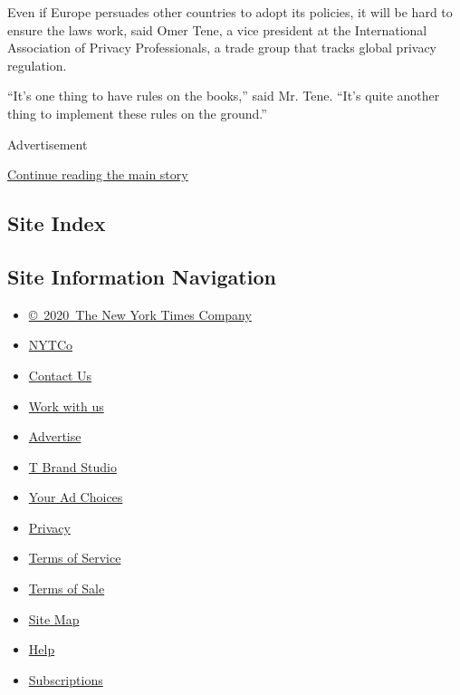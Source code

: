 Even if Europe persuades other countries to adopt its policies, it will
be hard to ensure the laws work, said Omer Tene, a vice president at the
International Association of Privacy Professionals, a trade group that
tracks global privacy regulation.

``It's one thing to have rules on the books,'' said Mr. Tene. ``It's
quite another thing to implement these rules on the ground.''

\begin{quote}
\end{quote}

Advertisement

\protect\hyperlink{after-bottom}{Continue reading the main story}

\hypertarget{site-index}{%
\subsection{Site Index}\label{site-index}}

\hypertarget{site-information-navigation}{%
\subsection{Site Information
Navigation}\label{site-information-navigation}}

\begin{itemize}
\tightlist
\item
  \href{https://help.nytimes.com/hc/en-us/articles/115014792127-Copyright-notice}{©~2020~The
  New York Times Company}
\end{itemize}

\begin{itemize}
\tightlist
\item
  \href{https://www.nytco.com/}{NYTCo}
\item
  \href{https://help.nytimes.com/hc/en-us/articles/115015385887-Contact-Us}{Contact
  Us}
\item
  \href{https://www.nytco.com/careers/}{Work with us}
\item
  \href{https://nytmediakit.com/}{Advertise}
\item
  \href{http://www.tbrandstudio.com/}{T Brand Studio}
\item
  \href{https://www.nytimes.com/privacy/cookie-policy\#how-do-i-manage-trackers}{Your
  Ad Choices}
\item
  \href{https://www.nytimes.com/privacy}{Privacy}
\item
  \href{https://help.nytimes.com/hc/en-us/articles/115014893428-Terms-of-service}{Terms
  of Service}
\item
  \href{https://help.nytimes.com/hc/en-us/articles/115014893968-Terms-of-sale}{Terms
  of Sale}
\item
  \href{https://spiderbites.nytimes.com}{Site Map}
\item
  \href{https://help.nytimes.com/hc/en-us}{Help}
\item
  \href{https://www.nytimes.com/subscription?campaignId=37WXW}{Subscriptions}
\end{itemize}
